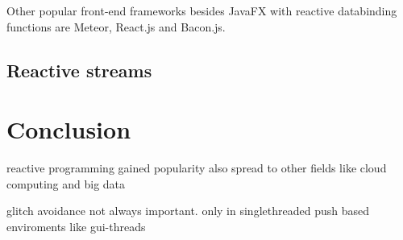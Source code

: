 \documentclass[acmsmall]{acmart}\settopmatter{printfolios=true,printccs=false,printacmref=false}
\begin{document}
		Other popular front-end frameworks besides JavaFX with reactive databinding functions are Meteor, React.js and Bacon.js.
	\subsection{Reactive streams}

\section{Conclusion}


reactive programming gained popularity also spread to other fields like cloud computing and big data \cite{Salvaneschi:2015}

glitch avoidance not always important. only in singlethreaded push based enviroments like gui-threads



\end{document}
